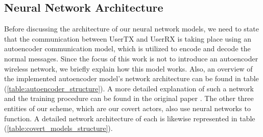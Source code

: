 \subsection{Neural Network Architecture}
Before discussing the architecture of our neural network models, we need to state that the communication between UserTX and UserRX is taking place using an autoencoder communication model, which is utilized to encode and decode the normal messages. Since the focus of this work is not to introduce an autoencoder wireless network, we briefly explain how this model works. Also, an overview of the implemented autoencoder model's network architecture can be found in table (\ref{table:autoencoder_structure}). A more detailed explanation of such a network and the training procedure can be found in the original paper \cite{o2017introduction}. The other three entities of our scheme, which are our covert actors, also use neural networks to function. A detailed network architecture of each is likewise represented in table (\ref{table:covert_models_structure}).\\
